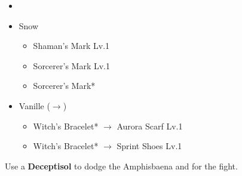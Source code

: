 \begin{menu}
	\begin{itemize}
	\paradigm
		\begin{itemize}
			\item {}%
				{\paradigmline[4]{(\rav)}{\rav}{\sab}}%
				{\paradigmline{\com)}{(\com)}{(\com)}}%
				{\paradigmline{\com}{(\rav)}{\med}}%
				{\paradigmline{\com}{\sen}{\med}}%
				{\paradigmline{\syn}{\sen}{(\sab)}}%
				{\paradigmline{(\com)}{(\com)}{\med}}%
		\end{itemize}
	\equip
		\begin{itemize}
			\item Snow
				\begin{itemize}
					\item Shaman's Mark Lv.1
					\item Sorcerer's Mark Lv.1
					\item Sorcerer's Mark*
				\end{itemize}
			\item Vanille ($\rightarrow$)
				\begin{itemize}
					\item Witch's Bracelet* $\rightarrow$ Aurora Scarf Lv.1
					\item Witch's Bracelet* $\rightarrow$ Sprint Shoes Lv.1
				\end{itemize}
		\end{itemize}
	\end{itemize}
\end{menu}

\renewcommand{\first}{[1] Smart Bomb (\rav/\rav/\sab)}
\renewcommand{\second}{[2] Cerberus (\com/\com/\com)}
\renewcommand{\third}{[3] Thaumaturgy (\rav\rav\med)}
\renewcommand{\fifth}{[5] Premeditation (\syn/\sen/\sab)}
\renewcommand{\sixth}{[6] Tireless Charge (\com/\com/\med)}

Use a \textbf{Deceptisol} to dodge the Amphisbaena and for the fight.

